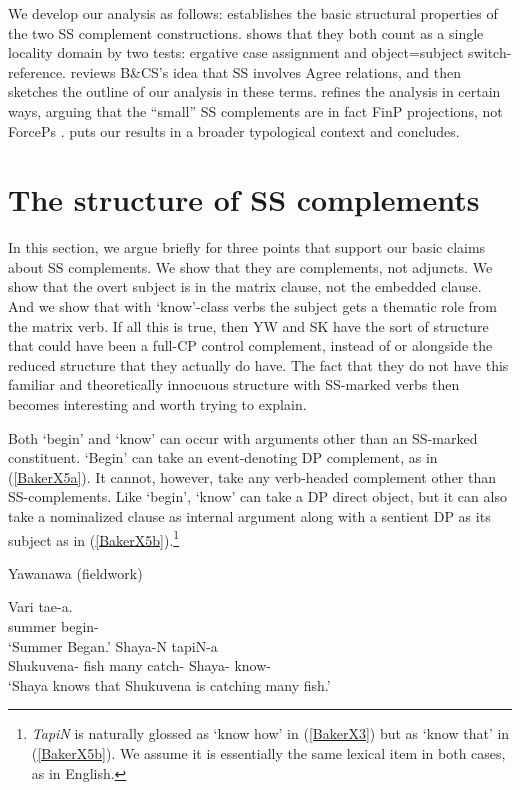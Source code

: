 \documentclass[output=paper]{langscibook}
\begin{document}
We develop our analysis as follows:  establishes the basic structural properties of the two SS complement constructions.  shows that they both count as a single locality domain by two tests: ergative case assignment and object=subject switch-re\-fer\-ence.  reviews B\&CS’s idea that SS involves Agree relations, and then sketches the outline of our analysis in these terms.  refines the analysis in certain ways, arguing that the “small” SS complements are in fact FinP projections, not ForcePs \citep{rizzi1997fine}.  puts our results in a broader typological context and concludes.

\section{The structure of SS complements}\label{sec:baker:2}

In this section, we argue briefly for three points that support our basic claims about SS complements. We show that they are complements, not adjuncts. We show that the overt subject is in the matrix clause, not the embedded clause. And we show that with `know’-class verbs the subject gets a thematic role from the matrix verb. If all this is true, then YW and SK have the sort of structure that could have been a full-CP control complement, instead of or alongside the reduced structure that they actually do have. The fact that they do not have this familiar and theoretically innocuous structure with SS-marked verbs then becomes interesting and worth trying to explain.

Both `begin’ and `know’ can occur with arguments other than an SS-marked constituent. `Begin’ can take an event-denoting DP complement, as in (\ref{BakerX5a}). It cannot, however, take any verb-headed complement other than SS-complements. Like `begin’, `know’ can take a DP direct object, but it can also take a nominalized clause as internal argument along with a sentient DP as its subject as in (\ref{BakerX5b}).\footnote{\textit{TapiN} is naturally glossed as `know how’ in (\ref{BakerX3}) but as `know that’ in (\ref{BakerX5b}). We assume it is essentially the same lexical item in both cases, as in English.}

\begin{exe}
    \ex Yawanawa (fieldwork) \label{BakerX5}
	    \begin{xlist}
			\ex \label{BakerX5a}
			\gll Vari tae-a.\\
			     summer begin-\\
			    \glt `Summer Began.'
			\ex \label{BakerX5b}
			 Shaya-N tapiN-a\\
    			 Shukuvena- fish many catch- Shaya- know-\\
			    \glt `Shaya knows that Shukuvena is catching many fish.'
		\end{xlist}
\end{exe}
\end{document}
